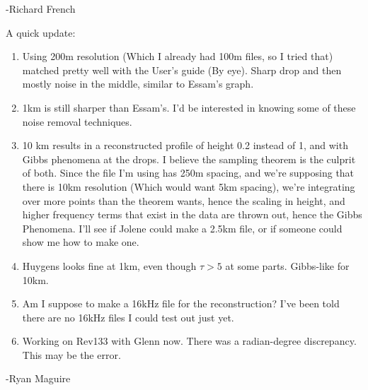 \documentclass[crop=false,class=book]{standalone}
\begin{document}
-Richard French\par
A quick update:
\begin{enumerate}
    \item Using 200m resolution (Which I already had 100m files, so I tried that) matched pretty well with the User's guide (By eye). Sharp drop and then mostly noise in the middle, similar to Essam's graph.
    \item 1km is still sharper than Essam's. I'd be interested in knowing some of these noise removal techniques.
    \item 10 km results in a reconstructed profile of height 0.2 instead of 1, and with Gibbs phenomena at the drops. I believe the sampling theorem is the culprit of both. Since the file I'm using has 250m spacing, and we're supposing that there is 10km resolution (Which would want 5km spacing), we're integrating over more points than the theorem wants, hence the scaling in height, and higher frequency terms that exist in the data are thrown out, hence the Gibbs Phenomena. I'll see if Jolene could make a 2.5km file, or if someone could show me how to make one.
    \item Huygens looks fine at 1km, even though $\tau>5$ at some parts. Gibbs-like for 10km.
    \item Am I suppose to make a 16kHz file for the reconstruction? I've been told there are no 16kHz files I could test out just yet.
    \item Working on Rev133 with Glenn now. There was a radian-degree discrepancy. This may be the error.
\end{enumerate}
-Ryan Maguire
\end{document}
